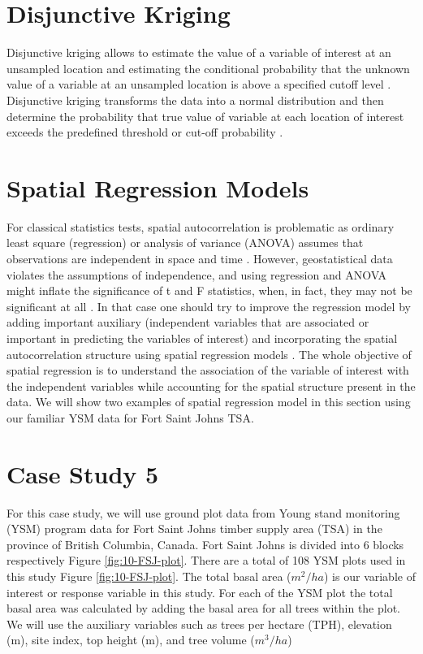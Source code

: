 \documentclass[
]{book}
\begin{document}
\hypertarget{disjunctive-kriging}{%
\section{Disjunctive Kriging}\label{disjunctive-kriging}}

Disjunctive kriging allows to estimate the value of a variable of interest at an unsampled location and estimating the conditional probability that the unknown value of a variable at an unsampled location is above a specified cutoff level \citep{yates_disjunctive_1986}. Disjunctive kriging transforms the data into a normal distribution and then determine the probability that true value of variable at each location of interest exceeds the predefined threshold or cut-off probability \citep{daya_comparative_2015}.

\hypertarget{spatial-regression-models}{%
\section{Spatial Regression Models}\label{spatial-regression-models}}

For classical statistics tests, spatial autocorrelation is problematic as ordinary least square (regression) or analysis of variance (ANOVA) assumes that observations are independent in space and time \citep{meng_spatial_2009}. However, geostatistical data violates the assumptions of independence, and using regression and ANOVA might inflate the significance of t and F statistics, when, in fact, they may not be significant at all \citep{meng_spatial_2009}. In that case one should try to improve the regression model by adding important auxiliary (independent variables that are associated or important in predicting the variables of interest) and incorporating the spatial autocorrelation structure \citep{meng_spatial_2009} using spatial regression models \citep{anselin_spatial_1998}. The whole objective of spatial regression is to understand the association of the variable of interest with the independent variables while accounting for the spatial structure present in the data. We will show two examples of spatial regression model in this section using our familiar YSM data for Fort Saint Johns TSA.

\hypertarget{case-study-5}{%
\section{Case Study 5}\label{case-study-5}}

For this case study, we will use ground plot data from Young stand monitoring (YSM) program data \citep{province_of_bc_provincial_2018} for Fort Saint Johns timber supply area (TSA) in the province of British Columbia, Canada. Fort Saint Johns is divided into 6 blocks respectively Figure \ref{fig:10-FSJ-plot}. There are a total of 108 YSM plots used in this study Figure \ref{fig:10-FSJ-plot}. The total basal area (\(m^2/ha\)) is our variable of interest or response variable in this study. For each of the YSM plot the total basal area was calculated by adding the basal area for all trees within the plot. We will use the auxiliary variables such as trees per hectare (TPH), elevation (m), site index, top height (m), and tree volume (\(m^3/ha\))
\end{document}
